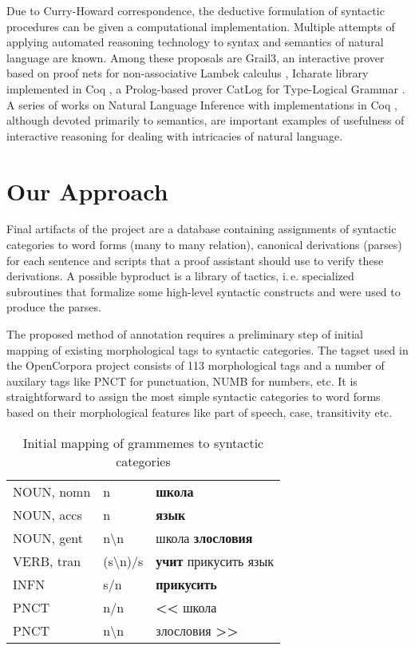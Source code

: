 \documentclass[a4paper]{article}
\theoremstyle{example-style}
\begin{document}
Due to Curry-Howard correspondence, the deductive formulation of syntactic procedures can be given a computational implementation. Multiple attempts of applying automated reasoning technology to syntax and semantics of natural language are known. Among these proposals are Grail3, an interactive prover based on proof nets for non-associative Lambek calculus \parencite{moot2002proof}, Icharate library implemented in Coq \parencite{anoun2007approche}, a Prolog-based prover CatLog for Type-Logical Grammar \parencite{morrill2012catlog}. A series of works on Natural Language Inference with implementations in Coq \parencite{chatzikyriakidis2014natural}, although devoted primarily to semantics, are important examples of usefulness of interactive reasoning for dealing with intricacies of natural language.


\section{Our Approach}

Final artifacts of the project are a database containing assignments of syntactic categories to word forms (many to many relation), canonical derivations (parses) for each sentence and scripts that a proof assistant should use to verify these derivations. A possible byproduct is a library of tactics, i.\,e. specialized subroutines that formalize some high-level syntactic constructs and were used to produce the parses. 

The proposed method of annotation requires a preliminary step of initial mapping of existing morphological tags to syntactic categories. The tagset used in the OpenCorpora project consists of 113 morphological tags and a number of auxilary tags like PNCT for punctuation, NUMB for numbers, etc. It is straightforward to assign the most simple syntactic categories to word forms based on their morphological features like part of speech, case, transitivity etc.

\begin{table}[ht]
\centering
\caption{Initial mapping of grammemes to syntactic categories}
\label{my-label}
\begin{tabular}{lll}
NOUN, nomn & n         & \textbf{школа}                              \\
NOUN, accs & n         & \textbf{язык}                               \\
NOUN, gent & n\textbackslash n      & школа \textbf{злословия}       \\
VERB, tran & (s\textbackslash n)/s & \textbf{учит} прикусить язык    \\
INFN       & s/n       & \textbf{прикусить}                          \\
PNCT       & n/n       & \textbf{\textless\textless} школа           \\
PNCT       & n\textbackslash n      & злословия \textbf{\textgreater\textgreater} 
\end{tabular}
\end{table}    
  
\end{document}
